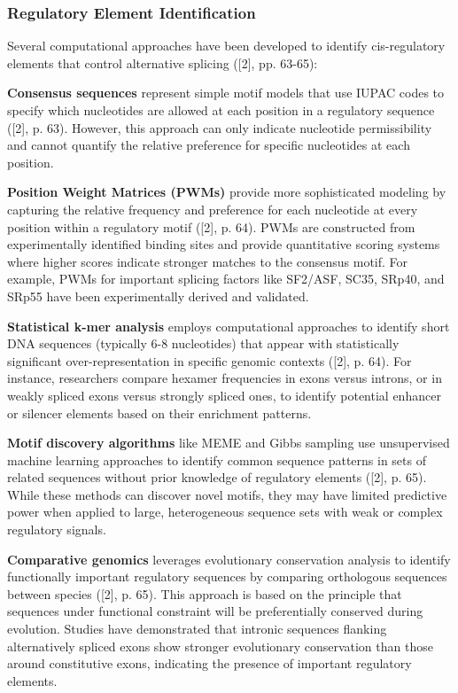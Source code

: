 \documentclass[12pt,a4paper]{article}
\begin{document}
\subsubsection{Regulatory Element Identification}

Several computational approaches have been developed to identify cis-regulatory elements that control alternative splicing ([2], pp. 63-65):

\textbf{Consensus sequences} represent simple motif models that use IUPAC codes to specify which nucleotides are allowed at each position in a regulatory sequence ([2], p. 63). However, this approach can only indicate nucleotide permissibility and cannot quantify the relative preference for specific nucleotides at each position.

\textbf{Position Weight Matrices (PWMs)} provide more sophisticated modeling by capturing the relative frequency and preference for each nucleotide at every position within a regulatory motif ([2], p. 64). PWMs are constructed from experimentally identified binding sites and provide quantitative scoring systems where higher scores indicate stronger matches to the consensus motif. For example, PWMs for important splicing factors like SF2/ASF, SC35, SRp40, and SRp55 have been experimentally derived and validated.

\textbf{Statistical k-mer analysis} employs computational approaches to identify short DNA sequences (typically 6-8 nucleotides) that appear with statistically significant over-representation in specific genomic contexts ([2], p. 64). For instance, researchers compare hexamer frequencies in exons versus introns, or in weakly spliced exons versus strongly spliced ones, to identify potential enhancer or silencer elements based on their enrichment patterns.

\textbf{Motif discovery algorithms} like MEME and Gibbs sampling use unsupervised machine learning approaches to identify common sequence patterns in sets of related sequences without prior knowledge of regulatory elements ([2], p. 65). While these methods can discover novel motifs, they may have limited predictive power when applied to large, heterogeneous sequence sets with weak or complex regulatory signals.

\textbf{Comparative genomics} leverages evolutionary conservation analysis to identify functionally important regulatory sequences by comparing orthologous sequences between species ([2], p. 65). This approach is based on the principle that sequences under functional constraint will be preferentially conserved during evolution. Studies have demonstrated that intronic sequences flanking alternatively spliced exons show stronger evolutionary conservation than those around constitutive exons, indicating the presence of important regulatory elements.
\end{document}
